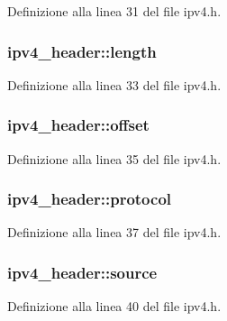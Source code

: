 Definizione alla linea 31 del file ipv4.\+h.

\hypertarget{structipv4__header_a369155b66b339effb565ee713000d695}{
\subsubsection[{length}]{ ipv4\+\_\+header\+::length}}\label{structipv4__header_a369155b66b339effb565ee713000d695}


Definizione alla linea 33 del file ipv4.\+h.

\hypertarget{structipv4__header_a6bae0493fa3323330e7c06c2d4ad0e4c}{
\subsubsection[{offset}]{ ipv4\+\_\+header\+::offset}}\label{structipv4__header_a6bae0493fa3323330e7c06c2d4ad0e4c}


Definizione alla linea 35 del file ipv4.\+h.

\hypertarget{structipv4__header_ad08e98e98c2ccf2472f9740b68071979}{
\subsubsection[{protocol}]{ ipv4\+\_\+header\+::protocol}}\label{structipv4__header_ad08e98e98c2ccf2472f9740b68071979}


Definizione alla linea 37 del file ipv4.\+h.

\hypertarget{structipv4__header_a87399a8dd7eb153478e63ce26450fe9c}{
\subsubsection[{source}]{ ipv4\+\_\+header\+::source}}\label{structipv4__header_a87399a8dd7eb153478e63ce26450fe9c}


Definizione alla linea 40 del file ipv4.\+h.

